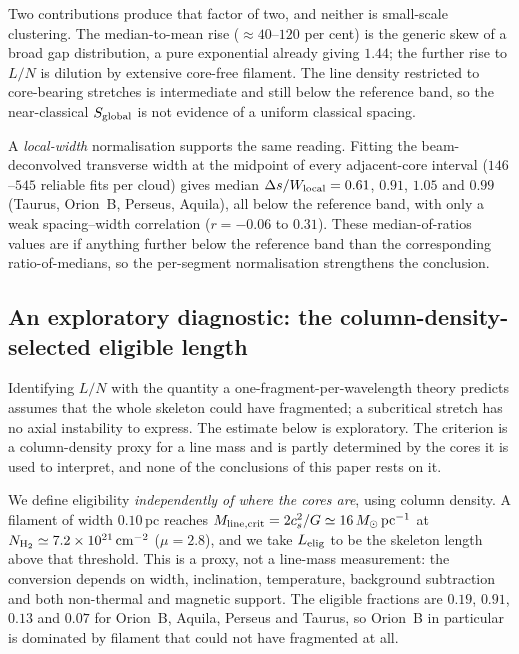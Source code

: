 \documentclass[usenatbib,twoside,twocolumn]{mnras}
\begin{document}
Two contributions produce that factor of two, and neither is small-scale clustering. The median-to-mean rise ($\approx40$--$120$ per cent) is the generic skew of a broad gap distribution, a pure exponential already giving $1.44$; the further rise to $L/N$ is dilution by extensive core-free filament. The line density restricted to core-bearing stretches is intermediate and still below the reference band, so the near-classical $S_{\rm global}$ is not evidence of a uniform classical spacing.

A \emph{local-width} normalisation supports the same reading. Fitting the beam-deconvolved transverse width at the midpoint of every adjacent-core interval ($146$--$545$ reliable fits per cloud) gives median $\Delta s/W_{\rm local}=0.61$, $0.91$, $1.05$ and $0.99$ (Taurus, Orion~B, Perseus, Aquila), all below the reference band, with only a weak spacing--width correlation ($r=-0.06$ to $0.31$). These median-of-ratios values are if anything further below the reference band than the corresponding ratio-of-medians, so the per-segment normalisation strengthens the conclusion.



\subsection{An exploratory diagnostic: the column-density-selected eligible length}
\label{sec:eligible}

Identifying $L/N$ with the quantity a one-fragment-per-wavelength theory predicts assumes that the whole skeleton could have fragmented; a subcritical stretch has no axial instability to express. The estimate below is exploratory. The criterion is a column-density proxy for a line mass and is partly determined by the cores it is used to interpret, and none of the conclusions of this paper rests on it.

We define eligibility \emph{independently of where the cores are}, using column density. A filament of width $0.10$\,pc reaches $M_{\rm line,crit}=2c_s^2/G\simeq16\,M_\odot\,{\rm pc^{-1}}$ at $N_{\rm H_2}\simeq7.2\times10^{21}\,{\rm cm^{-2}}$ ($\mu=2.8$), and we take $L_{\rm elig}$ to be the skeleton length above that threshold. This is a proxy, not a line-mass measurement: the conversion depends on width, inclination, temperature, background subtraction and both non-thermal and magnetic support. The eligible fractions are $0.19$, $0.91$, $0.13$ and $0.07$ for Orion~B, Aquila, Perseus and Taurus, so Orion~B in particular is dominated by filament that could not have fragmented at all.
\end{document}
